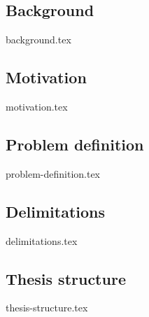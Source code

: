 

\subsection{Background}
{background.tex}


\subsection{Motivation}
{motivation.tex}


\subsection{Problem definition}
\label{sec:problemdefinition}
{problem-definition.tex}





\subsection{Delimitations}
{delimitations.tex}


\subsection{Thesis structure}
{thesis-structure.tex}


